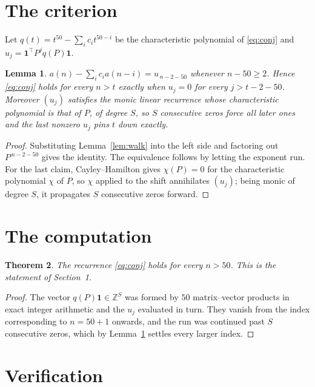 \documentclass[11pt,a4paper]{article}
\theoremstyle{plain}
\newtheorem{theorem}{Theorem}
\newtheorem{lemma}[theorem]{Lemma}
\theoremstyle{definition}
\begin{document}
\section{The criterion}

Let $q(t)=t^{50}-\sum_i c_i t^{50-i}$ be the characteristic polynomial of
\eqref{eq:conj} and $u_j=\mathbf{1}^{\!\top}P^{j}q(P)\mathbf{1}$.

\begin{lemma}\label{lem:crit}
$a(n)-\sum_i c_i a(n-i)=u_{\,n-2-50}$ whenever $n-50\ge2$. Hence
\eqref{eq:conj} holds for every $n>t$ exactly when $u_j=0$ for every
$j>t-2-50$. Moreover $(u_j)$ satisfies the monic linear recurrence whose
characteristic polynomial is that of $P$, of degree $S$, so $S$ consecutive zeros force all
later ones and the last nonzero $u_j$ pins $t$ down exactly.
\end{lemma}

\begin{proof}
Substituting Lemma~\ref{lem:walk} into the left side and factoring out
$P^{\,n-2-50}$ gives the identity. The equivalence follows by letting the exponent
run. For the last claim, Cayley--Hamilton gives $\chi(P)=0$ for the characteristic
polynomial $\chi$ of $P$, so $\chi$ applied to the shift annihilates $(u_j)$; being monic of
degree $S$, it propagates $S$ consecutive zeros forward.
\end{proof}

\section{The computation}

\begin{theorem}
The recurrence \eqref{eq:conj} holds for every $n>50$. This is the statement of
Section~1.
\end{theorem}

\begin{proof}
The vector $q(P)\mathbf{1}\in\mathbb{Z}^{S}$ was formed by $50$ matrix--vector
products in exact integer arithmetic and the $u_j$ evaluated in turn. They vanish from the
index corresponding to $n=50+1$ onwards, and the run was continued past $S$ consecutive
zeros, which by Lemma~\ref{lem:crit} settles every larger index.
\end{proof}

\section{Verification}
\end{document}
